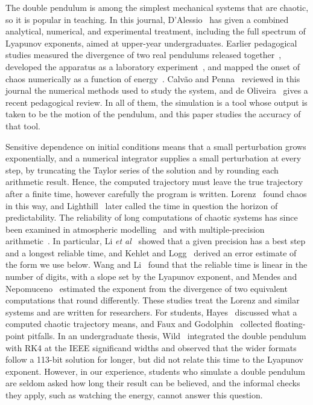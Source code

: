 \documentclass[12pt,a4paper]{article}
\begin{document}
The double pendulum is among the simplest mechanical systems that are chaotic,
so it is popular in teaching. In this journal, D'Alessio~\cite{dalessio2023}
has given a combined analytical, numerical, and experimental treatment,
including the full spectrum of Lyapunov exponents, aimed at upper-year
undergraduates. Earlier pedagogical studies measured the divergence of two real
pendulums released together~\cite{shinbrot1992}, developed the apparatus as a
laboratory experiment~\cite{levien1993}, and mapped the onset of chaos
numerically as a function of energy~\cite{stachowiak2006}. Calv\~ao and
Penna~\cite{calvao2015} reviewed in this journal the numerical methods used to
study the system, and de Oliveira~\cite{oliveira2024} gives a recent
pedagogical review. In all of them, the simulation is a tool whose
output is taken to be the motion of the pendulum, and this paper studies the
accuracy of that tool.

Sensitive dependence on initial conditions means that a small perturbation grows
exponentially, and a numerical integrator supplies a small perturbation at every
step, by truncating the Taylor series of the solution and by rounding each
arithmetic result. Hence, the computed trajectory must leave the true trajectory
after a finite time, however carefully the program is written.
Lorenz~\cite{lorenz1963} found chaos in this way, and
Lighthill~\cite{lighthill1986} later called the time in question the horizon of
predictability. The reliability of long computations of chaotic systems has
since been examined in atmospheric modelling~\cite{teixeira2007} and with
multiple-precision arithmetic~\cite{liao2009}. In particular, Li
\textit{et al}~\cite{li2001} showed that a given precision has a best step and a
longest reliable time, and Kehlet and Logg~\cite{kehlet2017} derived an error
estimate of the form we use below. Wang and Li~\cite{wang2014} found that the
reliable time is linear in the number of digits, with a slope set by the
Lyapunov exponent, and Mendes and Nepomuceno~\cite{mendes2016} estimated the
exponent from the divergence of two equivalent computations that round
differently. These studies treat the Lorenz and similar systems and are written
for researchers. For students, Hayes~\cite{hayes2004} discussed what a computed
chaotic trajectory means, and Faux and Godolphin~\cite{faux2021} collected
floating-point pitfalls. In an undergraduate thesis, Wild~\cite{wild2019}
integrated the double pendulum with RK4 at the IEEE significand widths and
observed that the wider formats follow a 113-bit solution for longer, but did not
relate this time to the Lyapunov exponent. However, in our experience,
students who simulate a double pendulum are seldom asked how long their result
can be believed, and the informal checks they apply, such as watching the
energy, cannot answer this question.
\end{document}
